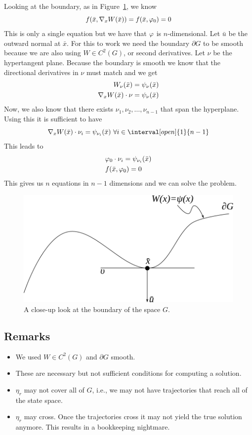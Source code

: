 Looking at the boundary, as in Figure~\ref{fig:15gboundary}, we know
$$f(\bar{x},\nabla_xW(\bar{x})) = f(\bar{x},\varphi_0) = 0$$
This is only a single equation but we have that $\varphi$ is $n$-dimensional.
Let $\bar{u}$ be the outward normal at $\bar{x}$.
For this to work we need the boundary $\partial G$ to be smooth because we are also using $W\in C^2(G)$, or second derivatives.
Let $\nu$ be the hypertangent plane.
Because the boundary is smooth we know that the directional derivatives in $\nu$ must match and we get
\begin{align*}
W_\nu(\bar{x}) &= \psi_\nu(\bar{x}) \\
\nabla_xW(\bar{x})\cdot \nu &= \psi_\nu(\bar{x})
\end{align*}
Now, we also know that there exists $\nu_1,\nu_2,\ldots,\nu_{n-1}$ that span the hyperplane.
Using this it is sufficient to have
$$\nw(\bar{x})\cdot\nu_i = \psi_{\nu_i}(\bar{x})~\forall i\in\interval[open]{1}{n-1}$$
This leads to
\begin{align*}
&\varphi_0\cdot\nu_i = \psi_{\nu_i}(\bar{x}) \\
&f(\bar{x},\varphi_0) = 0
\end{align*}
This gives us $n$ equations in $n-1$ dimensions and we can solve the problem.

\begin{figure}[ht!]
\centering
\includegraphics[width=.4\textwidth]{images/15gboundary}
\caption{A close-up look at the boundary of the space $G$.}
\label{fig:15gboundary}
\end{figure}

\subsection{Remarks}
\begin{itemize}
\item We used $W\in C^2(G)$ and $\partial G$ smooth.
\item These are necessary but not sufficient conditions for computing a solution.
\item $\eta_r$ may not cover all of $G$, i.e., we may not have trajectories that reach all of the state space.
\item $\eta_r$ may cross.
      Once the trajectories cross it may not yield the true solution anymore.
      This results in a bookkeeping nightmare.
\end{itemize}

